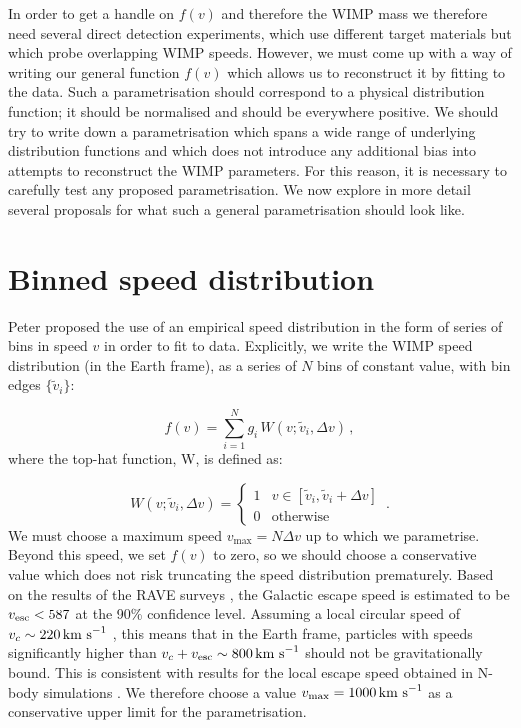 In order to get a handle on $f(v)$ and therefore the WIMP mass we therefore need several direct detection experiments, which use different target materials but which probe overlapping WIMP speeds. However, we must come up with a way of writing our general function $f(v)$ which allows us to reconstruct it by fitting to the data. Such a parametrisation should correspond to a physical distribution function; it should be normalised and should be everywhere positive. We should try to write down a parametrisation which spans a wide range of underlying distribution functions and which does not introduce any additional bias into attempts to reconstruct the WIMP parameters. For this reason, it is necessary to carefully test any proposed parametrisation. We now explore in more detail several proposals for what such a general parametrisation should look like.


\section{Binned speed distribution}

Peter proposed the use of an empirical speed distribution in the form of series of bins in speed $v$ in order to fit to data. Explicitly, we write the WIMP speed distribution (in the Earth frame), as a series of \(N\) bins of constant value, with bin edges \(\{ \tilde{v}_i\}\): 

\begin{equation}
\label{eq:Speed:binned}
f(v) = \sum_{i = 1}^N g_i \, W(v;\tilde{v}_i,\Delta v) \,,
\end{equation}
where the top-hat function, W, is defined as:

\begin{equation}
W(v;\tilde{v}_i,\Delta v) =
\begin{cases}
   1 &  v \in [\tilde{v}_i,\tilde{v}_i+\Delta v] \\
   0  & \text{otherwise}
  \end{cases} \,.
\end{equation}
We must choose a maximum speed $v_\textrm{max} = N\Delta v$ up to which we parametrise. Beyond this speed, we set $f(v)$ to zero, so we should choose a conservative value which does not risk truncating the speed distribution prematurely. Based on the results of the RAVE surveys \cite{RAVE:2007, RAVE:2014}, the Galactic escape speed is estimated to be $\vesc < 587$ at the 90\% confidence level. Assuming a local circular speed of $v_c \sim 220 \,\textrm{km s}^{-1}$ \cite{Kerr:1986,Feast:1997}, this means that in the Earth frame, particles with speeds significantly higher than $v_c + \vesc \sim 800 \kms$ should not be gravitationally bound. This is consistent with results for the local escape speed obtained in N-body simulations \cite{Kuhlen:2010}. We therefore choose a value $v_\textrm{max} = 1000 \,\textrm{km s}^{-1}$ as a conservative upper limit for the parametrisation.

